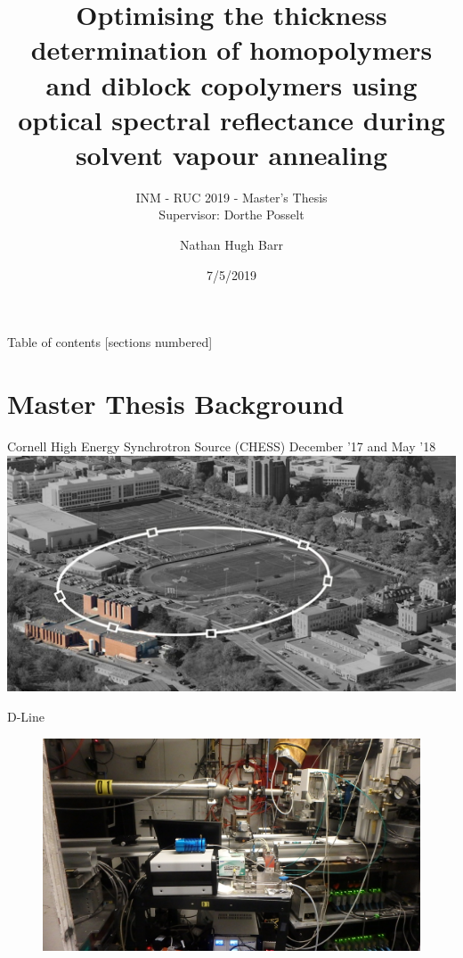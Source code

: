 \documentclass[10pt]{beamer}
\title{Optimising the thickness determination of homopolymers and diblock copolymers using optical spectral reflectance during solvent vapour annealing}
\subtitle{INM - RUC 2019 - Master's Thesis \\ Supervisor: Dorthe Posselt}
\date{7/5/2019}
\author{Nathan Hugh Barr}
\institute{Roskilde University}
\begin{document}
\maketitle

\begin{frame}{Table of contents}
  [sections numbered]
  \tableofcontents[hideallsubsections]
\end{frame}

	\section{Master Thesis Background}

\begin{frame}{Cornell High Energy Synchrotron Source (CHESS)}
	December '17 and May '18
	\includegraphics[width=\textwidth]{Ring.jpg}
\end{frame}

\begin{frame}{D-Line}
	\begin{figure}
		\includegraphics[scale=0.15]{chess3.JPG}
	\end{figure}
\end{frame}
\end{document}
